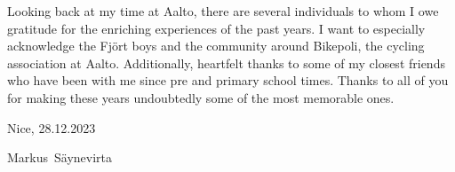 \documentclass[english, 12pt, a4paper, elec, utf8, a-1b, online]{aaltothesis}
\begin{document}
Looking back at my time at Aalto, there are several individuals to whom I owe gratitude for the enriching experiences of the past years. I want to especially acknowledge the Fjört boys and the community around Bikepoli, the cycling association at Aalto. Additionally, heartfelt thanks to some of my closest friends who have been with me since pre and primary school times. Thanks to all of you for making these years undoubtedly some of the most memorable ones.

\vspace{5cm}
Nice, 28.12.2023

\vspace{5mm}
{\hfill Markus\ Säynevirta \hspace{1cm}}

\newpage

\thesistableofcontents

\end{document}
